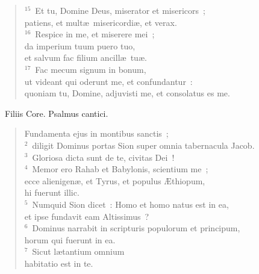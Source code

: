 \begin{flushleft}
\begin{verse}
${}^{15}$~Et tu, Domine Deus, miserator et misericors~;\\ patiens, et mult\ae\ misericordi\ae , et verax.\\
${}^{16}$~Respice in me, et miserere mei~;\\ da imperium tuum puero tuo,\\ et salvum fac filium ancill\ae\ tu\ae .\\
${}^{17}$~Fac mecum signum in bonum,\\ ut videant qui oderunt me, et confundantur~:\\ quoniam tu, Domine, adjuvisti me, et consolatus es me.\end{verse}\end{flushleft}


~\lettrine[lines=10,image=true,loversize=0.05,lraise=-0.03]{F}{}iliis Core. Psalmus cantici. \begin{flushleft}\begin{verse}\vspace{6pt}Fundamenta ejus in montibus sanctis~;\\
${}^{2}$~diligit Dominus portas Sion super omnia tabernacula Jacob.\\
${}^{3}$~Gloriosa dicta sunt de te, civitas Dei~!\\
${}^{4}$~Memor ero Rahab et Babylonis, scientium me~;\\ ecce alienigen\ae , et Tyrus, et populus \AE thiopum,\\ hi fuerunt illic.\\
${}^{5}$~Numquid Sion dicet~: Homo et homo natus est in ea,\\ et ipse fundavit eam Altissimus~?\\
${}^{6}$~Dominus narrabit in scripturis populorum et principum,\\ horum qui fuerunt in ea.\\
${}^{7}$~Sicut l\ae tantium omnium\\ habitatio est in te.\end{verse}\end{flushleft}


